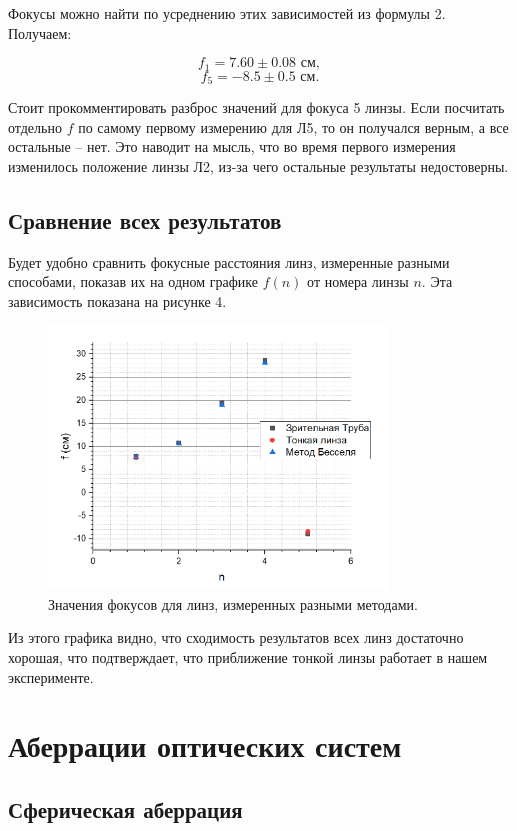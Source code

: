 \documentclass[a4paper, 14pt]{extarticle}%
\newcommand\ECaption[1]{%
     \captionsetup{font=footnotesize}%
     \caption{#1}}
\begin{document}
Фокусы можно найти по усреднению этих зависимостей из формулы 2. Получаем:

\[f_1 = 7.60 \pm 0.08 \text{ см},\]
\[f_5 = -8.5\pm 0.5 \text{ см}.\]

Стоит прокомментировать разброс значений для фокуса 5 линзы. Если посчитать отдельно $f$ по самому первому измерению для Л5, то он получался верным, а все остальные -- нет. Это наводит на мысль, что во время первого измерения изменилось положение линзы Л2, из-за чего остальные результаты недостоверны.

\subsection{Сравнение всех результатов}

Будет удобно сравнить фокусные расстояния линз, измеренные разными способами, показав их на одном графике $f(n)$ от номера линзы $n$. Эта зависимость показана на рисунке 4.


\begin{figure}[h!]
\begin{center}
\includegraphics[width=0.8\textwidth]{gr1}
\end{center}
\ECaption{Значения фокусов для линз, измеренных разными методами. }
\end{figure}

Из этого графика видно, что сходимость результатов всех линз достаточно хорошая, что подтверждает, что приближение тонкой линзы работает в нашем эксперименте.

\section{Аберрации оптических систем}
\subsection{Сферическая аберрация}
\end{document}
